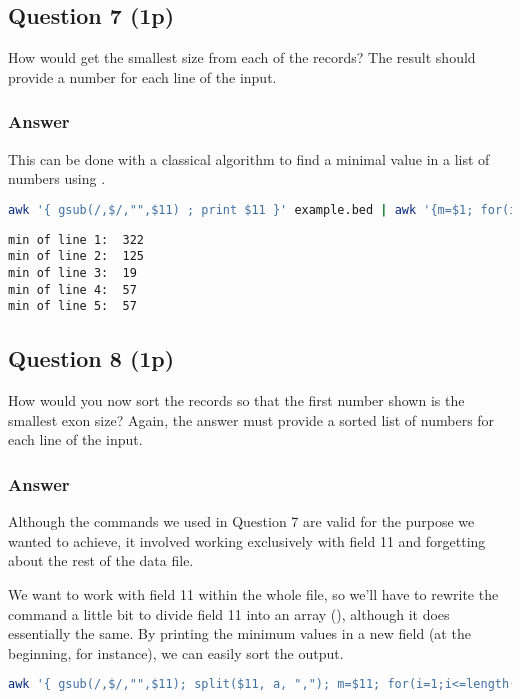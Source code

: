\subsection*{Question 7 (1p)}
How would get the smallest size from each of the records? The result should provide a number for each line of the input.

\subsubsection*{Answer}
This can be done with a classical algorithm to find a minimal value in a list of numbers using .

\begin{lstlisting}[language=bash]
awk '{ gsub(/,$/,"",$11) ; print $11 }' example.bed | awk '{m=$1; for(i=1;i<=NF;i++) if($i<m) m=$i; print "min of line", NR": ", m}' FS="," | head -n5
\end{lstlisting}

\begin{lstlisting}[style=output]
min of line 1:  322
min of line 2:  125
min of line 3:  19
min of line 4:  57
min of line 5:  57
\end{lstlisting}

\subsection*{Question 8 (1p)}
How would you now sort the records so that the first number shown is the smallest exon size? Again, the answer must provide a sorted list of numbers for each line of the input.

\subsubsection*{Answer}
Although the commands we used in Question 7 are valid for the purpose we wanted to achieve, it involved working exclusively with field 11 and forgetting about the rest of the data file.

We want to work with field 11 within the whole file, so we'll have to rewrite the command a little bit to divide field 11 into an array (), although it does essentially the same. By printing the minimum values in a new field (at the beginning, for instance), we can easily sort the output.
\begin{lstlisting}[language=bash]
awk '{ gsub(/,$/,"",$11); split($11, a, ","); m=$11; for(i=1;i<=length(a);i++) if(a[i]<m) m=a[i]; print m, $0}' OFS="\t" example.bed | sort -n 2>/dev/null | head -n5
\end{lstlisting}

